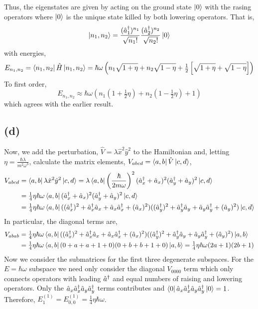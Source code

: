 \documentclass[12pt]{extarticle}
\begin{document}
Thus, the eigenstates are given by acting on the ground state $\left| 0 \right>$ with the rasing operators where $\left| 0 \right>$ is the unique state killed by both lowering operators. That is,
\[ \left| n_1, n_2 \right> = \frac{(\hat{a}^\dagger_1)^{n_1}}{\sqrt{n_1!}} \frac{(\hat{a}^\dagger_2)^{n_2}}{\sqrt{n_2!}} \left| 0 \right>\]
with energies,
\[E_{n_1,n_2} = \left< n_1, n_2 \right| \hat{H} \left| n_1, n_2 \right> = \hbar \omega \left(n_1 \sqrt{1 + \eta} + n_2 \sqrt{1 - \eta} + \tfrac{1}{2} \left[ \sqrt{1 + \eta} + \sqrt{1 - \eta} \right] \right)\]
To first order,
\[E_{n_1,n_2} \approx \hbar \omega \left(n_1 (1 + \tfrac{1}{2} \eta) + n_2 (1 - \tfrac{1}{2} \eta) + 1 \right)\]
which agrees with the earlier result. 
\subsection*{(d)}
Now, we add the perturbation, $\hat{V} = \lambda \hat{x}^2 \hat{y}^2$ to the Hamiltonian and, letting $\eta = \frac{\hbar \lambda }{m^2 \omega^3}$, calculate the matrix elements, $V_{abcd} = \left< a,b \right| \hat{V} \left| c, d \right>$,
\begin{align*}
V_{abcd} & = \left< a,b \right| \lambda \hat{x}^2 \hat{y}^2 \left| c,d \right> = \lambda \left< a,b \right| \left(\frac{\hbar}{2 m \omega} \right)^2 (\hat{a}^\dagger_x + \hat{a}_x)^2(\hat{a}^\dagger_y + \hat{a}_y)^2 \left| c,d \right> \\ & = \tfrac{1}{4} \eta \hbar \omega \left< a,b \right| (\hat{a}^\dagger_x + \hat{a}_x)^2(\hat{a}^\dagger_y + \hat{a}_y)^2 \left| c,d \right>\\
& = \tfrac{1}{4} \eta \hbar \omega \left< a,b \right| ((\hat{a}^\dagger_x)^2 + \hat{a}^\dagger_x \hat{a}_x + \hat{a}_x \hat{a}^\dagger_x + (\hat{a}_x)^2)((\hat{a}^\dagger_y)^2 + \hat{a}^\dagger_y \hat{a}_y + \hat{a}_y \hat{a}^\dagger_y + (\hat{a}_y)^2) \left| c,d \right>
\end{align*}
In particular, the diagonal terms are,
\begin{align*}
V_{abab} & = \tfrac{1}{4} \eta \hbar \omega \left< a,b \right| ((\hat{a}^\dagger_x)^2 + \hat{a}^\dagger_x \hat{a}_x + \hat{a}_x \hat{a}^\dagger_x + (\hat{a}_x)^2)((\hat{a}^\dagger_y)^2 + \hat{a}^\dagger_y \hat{a}_y + \hat{a}_y \hat{a}^\dagger_y + (\hat{a}_y)^2) \left| a,b \right> \\
& =  \tfrac{1}{4} \eta \hbar \omega \left< a,b \right| (0 + a + a + 1 + 0)(0 + b + b + 1 + 0) \left| a,b \right> = \tfrac{1}{4} \eta \hbar \omega (2a + 1)(2b + 1)
\end{align*}
Now we consider the submatrices for the first three degenerate subspaces. For the $E = \hbar \omega$ subspace we need only consider the diagonal $V_{0000}$ term which only connects operators with leading $\hat{a}^\dagger$ and equal numbers of raising and lowering operators. Only the $\hat{a}_x \hat{a}^\dagger_x \hat{a}_y \hat{a}^\dagger_y$ terms contributes and $\left< 0 \right| \hat{a}_x \hat{a}^\dagger_x \hat{a}_y \hat{a}^\dagger_y \left| 0 \right> = 1$. Therefore, $E^{(1)}_{1} = E^{(1)}_{0,0} = \tfrac{1}{4} \eta \hbar \omega$. \bigskip \\\\
\end{document}
